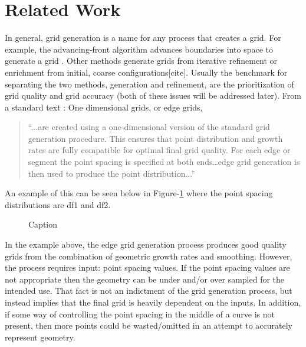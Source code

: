 \documentclass[preprint,12pt]{elsarticle}
\begin{document}
\section{Related Work}
In general, grid generation is a name for any process that creates a grid.  For example, the advancing-front algorithm advances boundaries into space to generate a grid \cite{lohner88}.  Other methods generate grids from iterative refinement or enrichment from initial, coarse configurations[cite].  Usually the benchmark for separating the two methods, generation and refinement, are the prioritization of grid quality and grid accuracy (both of these issues will be addressed later).  From a standard text \cite{thompson98}: One dimensional grids, or edge grids, \begin{quotation} \noindent ``...are created using a one-dimensional version of the standard grid generation procedure.  This ensures that point distribution and growth rates are fully compatible for optimal final grid quality.  For each edge or segment the point spacing is specified at both ends…edge grid generation is then used to produce the point distribution...'' \end{quotation} An example of this can be seen below in Figure-\ref{EdgeGrid_HandbookOfGridGeneration} where the point spacing distributions are df1 and df2.

\begin{figure}[h!]
  \caption{\label{EdgeGrid_HandbookOfGridGeneration} Caption}
\end{figure}

\noindent In the example above, the edge grid generation process produces good quality grids from the combination of geometric growth rates and smoothing.  However, the process requires input: point spacing values.  If the point spacing values are not appropriate then the geometry can be under and/or over sampled for the intended use.  That fact is not an indictment of the grid generation process, but instead implies that the final grid is heavily dependent on the inputs.  In addition, if some way of controlling the point spacing in the middle of a curve is not present, then more points could be wasted/omitted in an attempt to accurately represent geometry.
\end{document}
